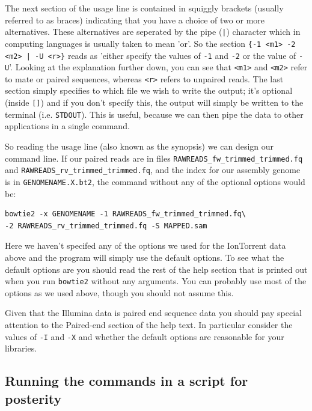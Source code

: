 \documentclass[11pt]{article}
\begin{document}
The next section of the usage line is contained in squiggly brackets (usually
referred to as braces) indicating that you have a choice of two or more
alternatives. These alternatives are seperated by the pipe (\texttt{|}) character
which in computing languages is usually taken to mean 'or'. So the section 
\texttt{\{-1 <m1> -2 <m2> | -U <r>\}} reads as 'either specify the values of \texttt{-1} and
\texttt{-2} or the value of \texttt{-U}'. Looking at the explanation further down, you can
see that \texttt{<m1>} and \texttt{<m2>} refer to mate or paired sequences, whereas \texttt{<r>}
refers to unpaired reads. The last section simply specifies to which file we
wish to write the output; it's optional (inside \texttt{[]}) and if you don't specify this, 
the output will simply be
written to the terminal (i.e. \texttt{STDOUT}). This is useful, because we can then
pipe the data to other applications in a single command.

So reading the usage line (also known as the synopsis) we can design our
command line. If our paired reads are in files
\texttt{RAWREADS\_fw\_trimmed\_trimmed.fq} and 
\texttt{RAWREADS\_rv\_trimmed\_trimmed.fq}, and the index for our assembly genome is in 
\texttt{GENOMENAME.X.bt2}, the command without any of the optional options would be:

\begin{verbatim}
bowtie2 -x GENOMENAME -1 RAWREADS_fw_trimmed_trimmed.fq\
-2 RAWREADS_rv_trimmed_trimmed.fq -S MAPPED.sam
\end{verbatim}

Here we haven't specifed any of the options we used for the IonTorrent data
above and the program will simply use the default options. To see what the
default options are you should read the rest of the help section that is
printed out when you run \texttt{bowtie2} without any arguments. You can probably
use most of the options as we used above, though you should not assume this.

Given that the Illumina data is paired end sequence data you should pay
special attention to the Paired-end section of the help text. In particular
consider the values of \texttt{-I} and \texttt{-X} and whether the default options are
reasonable for your libraries.

\subsection{Running the commands in a script for posterity}
\label{sec:orgheadline2}
\end{document}
